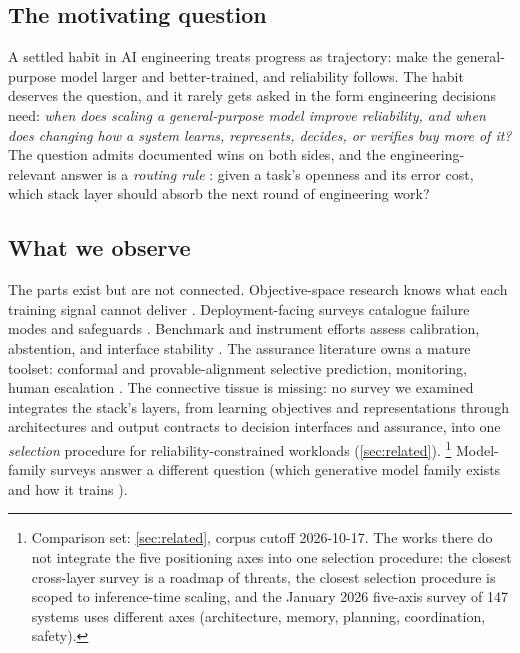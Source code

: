 \subsection{The motivating question}
A settled habit in AI engineering treats progress as trajectory: make the general-purpose
model larger and better-trained, and reliability follows. The habit deserves the question, and it
rarely gets asked in the form engineering decisions need: \emph{when does scaling a
general-purpose model improve reliability, and when does changing how a system learns,
represents, decides, or verifies buy more of it?} The question admits documented wins on both
sides, and the engineering-relevant answer is a \emph{routing rule}
\cite{leaderillusion2025}: given a task's openness and its error cost, which stack layer should
absorb the next round of engineering work?

\subsection{What we observe}
The parts exist but are not connected. Objective-space research knows what each training signal
cannot deliver \cite{klindt2026lejepa,austin2021d3pm,nichol2021improved}. Deployment-facing
surveys catalogue failure modes and safeguards \cite{mdpi2026arlm,id250206872,id221116158}.
Benchmark and instrument efforts assess calibration, abstention, and interface stability
\cite{id261002267,id260933843}. The assurance literature owns a mature toolset: conformal
and provable-alignment selective prediction, monitoring, human escalation
\cite{id240501563,id260704430}. The connective tissue is missing: no survey we examined
integrates the stack's layers, from learning objectives and representations through
architectures and output contracts to decision interfaces and assurance, into one
\emph{selection} procedure for reliability-constrained workloads (\cref{sec:related}).
\footnote{Comparison set: \cref{sec:related}, corpus cutoff 2026-10-17. The works there do not
integrate the five positioning axes into one selection procedure: the closest cross-layer
survey \cite{ida25192} is a roadmap of threats, the closest selection procedure \cite{raie2026}
is scoped to inference-time scaling, and the January 2026 five-axis survey of 147 systems
\cite{ssrn2026fiveaxis} uses different axes (architecture, memory, planning, coordination,
safety).} Model-family surveys answer a different question (which generative model family exists
and how it trains
\cite{almuammar2026genai,yazdani2025genaidepth}).

